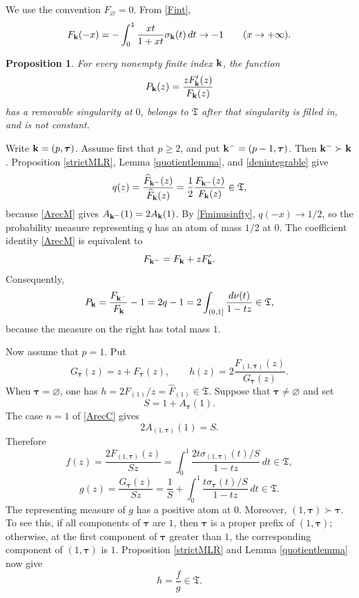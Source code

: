 \documentclass[12pt,a4paper]{amsart}
\makeatletter
\numberwithin{equation}{section}
\renewenvironment{proof}[1][Proof]{%
  \par\pushQED{\qed}%
  \normalfont\topsep6\p@\@plus6\p@\relax
  \trivlist
  \item[\hskip\labelsep\bfseries #1:]\ignorespaces
}{%
  \popQED\endtrivlist\@endpefalse
}
\theoremstyle{plain}
\newtheorem{prop}[Thm]{Proposition}
\theoremstyle{definition}
\makeatother
\begin{document}
We use the convention $F_{\varnothing}=0$.  From \eqref{Fint},
\begin{equation}\label{Fminusinfty}
F_{\bf k}(-x)
=-\int_0^1\frac{xt}{1+xt}\sigma_{\bf k}(t)\,dt
\rightarrow -1
\qquad(x\rightarrow+\infty).
\end{equation}

\begin{prop}\label{logderivative}
For every nonempty finite index ${\bf k}$, the function
\begin{equation}\label{Pdef}
P_{\bf k}(z)=\frac{zF_{\bf k}'(z)}{F_{\bf k}(z)}
\end{equation}
has a removable singularity at $0$, belongs to $\mathfrak{T}$ after that singularity is filled in, and is not constant.
\end{prop}

\begin{proof}
Write ${\bf k}=(p,{\boldsymbol\tau})$. Assume first that $p\geq 2$, and put ${\bf k}^{-}=(p-1,{\boldsymbol\tau})$.  Then ${\bf k}^{-}\succ{\bf k}$.  Proposition \ref{strictMLR}, Lemma \ref{quotientlemma}, and \eqref{denintegrable} give
\begin{equation}\label{qminus}
q(z)=\frac{\widehat F_{{\bf k}^{-}}(z)}{\widehat F_{\bf k}(z)}
=\frac12\frac{F_{{\bf k}^{-}}(z)}{F_{\bf k}(z)}
\in\mathfrak{T},
\end{equation}
because \eqref{ArecM} gives
$A_{{\bf k}^{-}}(1)=2A_{\bf k}(1)$.  By \eqref{Fminusinfty}, $q(-x)\rightarrow1/2$, so the probability measure representing $q$ has an atom of mass $1/2$ at $0$.  The coefficient identity \eqref{ArecM} is equivalent to
\[
F_{{\bf k}^{-}}=F_{\bf k}+zF_{\bf k}'.
\]
Consequently,
\[
P_{\bf k}=\frac{F_{{\bf k}^{-}}}{F_{\bf k}}-1
=2q-1
=2\int_{(0,1]}\frac{d\nu(t)}{1-tz}\in\mathfrak{T},
\]
because the measure on the right has total mass $1$.

Now assume that $p=1$.  Put
\[
G_{\boldsymbol\tau}(z)=z+F_{\boldsymbol\tau}(z),
\qquad
h(z)=2\frac{F_{(1,{\boldsymbol\tau})}(z)}{G_{\boldsymbol\tau}(z)}.
\]
When ${\boldsymbol\tau}=\varnothing$, one has
$h=2F_{(1)}/z=\widehat F_{(1)}\in\mathfrak{T}$.  Suppose that ${\boldsymbol\tau}\neq\varnothing$ and set
\[
S=1+A_{\boldsymbol\tau}(1).
\]
The case $n=1$ of \eqref{ArecC} gives
\begin{equation}\label{halfcoefficient}
2A_{(1,{\boldsymbol\tau})}(1)=S.
\end{equation}
Therefore
\[
f(z)=\frac{2F_{(1,{\boldsymbol\tau})}(z)}{Sz}
=\int_0^1\frac{2t\sigma_{(1,{\boldsymbol\tau})}(t)/S}{1-tz}\,dt
\in\mathfrak{T},
\]
\[
g(z)=\frac{G_{\boldsymbol\tau}(z)}{Sz}
=\frac1S+\int_0^1\frac{t\sigma_{\boldsymbol\tau}(t)/S}{1-tz}\,dt
\in\mathfrak{T}.
\]
The representing measure of $g$ has a positive atom at $0$.  Moreover,
$(1,{\boldsymbol\tau})\succ{\boldsymbol\tau}$.  To see this, if all components of ${\boldsymbol\tau}$ are $1$, then ${\boldsymbol\tau}$ is a proper prefix of $(1,{\boldsymbol\tau})$; otherwise, at the first component of ${\boldsymbol\tau}$ greater than $1$, the corresponding component of $(1,{\boldsymbol\tau})$ is $1$.  Proposition \ref{strictMLR} and Lemma \ref{quotientlemma} now give
\[
h=\frac fg\in\mathfrak{T}.
\]


\end{proof}
\end{document}
